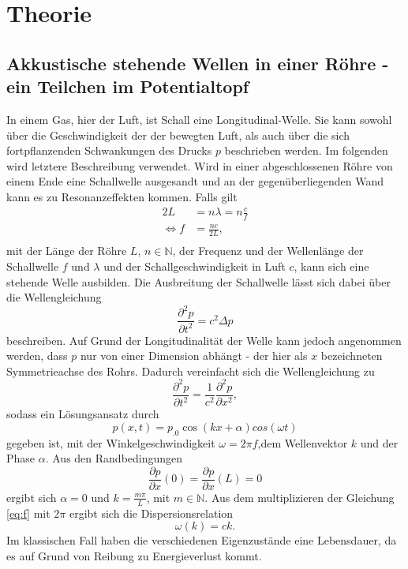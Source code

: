 \section{Theorie}
\label{sec:Theorie}

\subsection{Akkustische stehende Wellen in einer Röhre - ein Teilchen im Potentialtopf}
In einem Gas, hier der Luft, ist Schall eine Longitudinal-Welle. Sie kann sowohl über die Geschwindigkeit der der bewegten Luft, als auch über die sich fortpflanzenden Schwankungen des Drucks $p$ beschrieben werden. Im folgenden wird letztere Beschreibung verwendet.
Wird in einer abgeschlossenen Röhre von einem Ende eine Schallwelle ausgesandt und an der gegenüberliegenden Wand kann es zu Resonanzeffekten kommen. Falls gilt
\begin{align}
2L&=n\lambda=n\frac{c}{f}\\
\Leftrightarrow f&=\frac{n c}{2L},\\\label{eq:f}
\end{align}
mit der Länge der Röhre $L$, $n\in\mathbb{N}$, der Frequenz und der Wellenlänge der Schallwelle $f$ und $\lambda$ und der Schallgeschwindigkeit in Luft $c$, kann sich eine stehende Welle ausbilden.
Die Ausbreitung der Schallwelle lässt sich dabei über die Wellengleichung
\begin{equation}
\frac{\partial^2 p}{\partial t^2}=c^2\Delta p\label{eq:WGL}
\end{equation}
beschreiben. Auf Grund der Longitudinalität der Welle kann jedoch angenommen werden, dass $p$ nur von einer Dimension abhängt - der hier als $x$ bezeichneten Symmetrieachse des Rohrs. Dadurch vereinfacht sich die Wellengleichung zu
\[
\frac{\partial^2 p}{\partial t^2}=\frac{1}{c^2}\frac{\partial^2 p}{\partial x^2},
\]
sodass ein Lösungsansatz durch
\[
p(x,t)=p_.0\cos(k x +\alpha)cos(\omega t)
\]
gegeben ist, mit der Winkelgeschwindigkeit $\omega=2\pi f$,dem Wellenvektor $k$ und der Phase $\alpha$. Aus den Randbedingungen 
\[
\frac{\partial p}{\partial x}(0)=\frac{\partial p}{\partial x}(L)=0
\]
ergibt sich $\alpha=0$ und $k=\frac{m\pi}{L}$, mit $m\in\mathbb{N}$.
Aus dem multiplizieren der Gleichung \eqref{eq:f} mit $2\pi$ ergibt sich die Dispersionsrelation
\begin{equation}
\omega(k)=c k\text{.}\label{eq:omega_k}
\end{equation}
Im klassischen Fall haben die verschiedenen Eigenzustände eine Lebensdauer, da es auf Grund von Reibung zu Energieverlust kommt.
